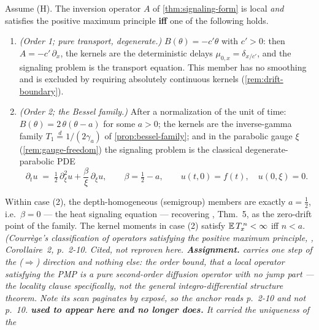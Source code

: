 \begin{theorem}\label{thm:locality}
Assume (H). The inversion operator $A$ of \ref{thm:signaling-form} is local \emph{and}
satisfies the positive maximum principle \textbf{iff} one of the following holds.
\begin{enumerate}
\item \emph{(Order 1; pure transport, degenerate.)} $B(\theta) = -c'\theta$ with $c' > 0$: then
$A = -c'\,\partial_x$, the kernels are the deterministic delays $\mu_{0,x} = \delta_{x/c'}$,
and the signaling problem is the transport equation. This member has no smoothing and is
excluded by requiring absolutely continuous kernels (\ref{rem:drift-boundary}).
\item \emph{(Order 2; the Bessel family.)} After a normalization of the unit of time:
$B(\theta) = 2\,\theta(\theta - a)$ for some $a > 0$; the kernels are the
inverse-gamma family $T_1 \stackrel{d}{=} 1/(2\gamma_a)$ of \ref{prop:bessel-family}; and in
the parabolic gauge $\xi$ (\ref{rem:gauge-freedom}) the signaling problem is the classical
degenerate-parabolic PDE
\[
  \partial_t u \;=\; \tfrac12\,\partial_\xi^2 u + \frac{\beta}{\xi}\,\partial_\xi u,
  \qquad \beta = \tfrac12 - a, \qquad u(t,0) = f(t),\quad u(0,\xi) = 0 .
\]
\end{enumerate}
Within case (2), the depth-homogeneous (semigroup) members are exactly $a = \tfrac12$, i.e.\
$\beta = 0$ --- the heat signaling equation --- recovering
, Thm.~5, as the zero-drift point of the family. The kernel
moments in case (2) satisfy $\mathbb{E}\,T_x^{\,n} < \infty$ iff $n < a$.
\statusA\quad\ledger{A14}\quad\emph{(Courrège's classification of operators satisfying the
positive maximum principle, \sscite{courrege1966sur}, Corollaire~2, p.~2-10. Cited, not
reproven here.
\textbf{Assignment.}  carries one step of the ($\Rightarrow$) direction and
nothing else: the order bound, that a local operator satisfying the PMP is a pure second-order
diffusion operator with no jump part --- the locality clause specifically, not the general
integro-differential structure theorem. Note its scan paginates by exposé, so the anchor reads
p.~2-10 and not p.~10.
\textbf{ used to appear here and no longer does.} It carried the uniqueness of the
}
\end{theorem}
